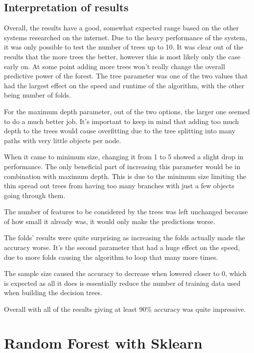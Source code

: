 \subsection{Interpretation of results}
Overall, the results have a good, somewhat expected range based on the other systems researched on the internet. Due to the heavy performance of the system, it was only possible to test the number of trees up to 10. It was clear out of the results that the more trees the better, however this is most likely only the case early on. At some point adding more trees won't really change the overall predictive power of the forest. The tree parameter was one of the two values that had the largest effect on the speed and runtime of the algorithm, with the other being number of folds.

For the maximum depth parameter, out of the two options, the larger one seemed to do a much better job. It's important to keep in mind that adding too much depth to the trees would cause overfitting due to the tree splitting into many paths with very little objects per node. 

When it came to minimum size, changing it from 1 to 5 showed a slight drop in performance. The only beneficial part of increasing this parameter would be in combination with maximum depth. This is due to the minimum size limiting the thin spread out trees from having too many branches with just a few objects going through them. 

The number of features to be considered by the trees was left unchanged because of how small it already was, it would only make the predictions worse. 

The folds' results were quite surprising as increasing the folds actually made the accuracy worse. It's the second parameter that had a huge effect on the speed, due to more folds causing the algorithm to loop that many more times. 

The sample size caused the accuracy to decrease when lowered closer to 0, which is expected as all it does is essentially reduce the number of training data used when building the decision trees.

Overall with all of the results giving at least 90\% accuracy was quite impressive. 




\section{Random Forest with Sklearn}

